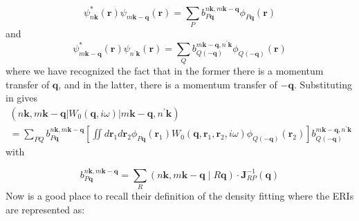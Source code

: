\begin{equation*}
\psi_{n \mathbf{k}}^{*}(\mathbf{r}) \psi_{m \mathbf{k}-\mathbf{q}}(\mathbf{r})=\sum_{P} b_{P \mathbf{q}}^{n \mathbf{k}, m \mathbf{k}-\mathbf{q}} \phi_{P \mathbf{q}}(\mathbf{r}) 
\end{equation*}
and
\begin{equation}
    \psi_{m\mathbf{k}-\mathbf{q}}^{*}(\mathbf{r}) \psi_{n^{\prime}\mathbf{k}}(\mathbf{r}) = \sum_{Q} b_{Q(-\mathbf{q})}^{m\mathbf{k}-\mathbf{q}, n^{\prime}\mathbf{k}} \phi_{Q(-\mathbf{q})}(\mathbf{r})
\end{equation}
where we have recognized the fact that in the former there is a momentum transfer of $\mathbf{q}$, and in the latter, there is a momentum transfer of $-\mathbf{q}$.
Substituting in gives
\begin{align}
    \left(n\mathbf{k}, m\mathbf{k}-\mathbf{q}\left|W_{0}(\mathbf{q}, i\omega )\right| m\mathbf{k}-\mathbf{q}, n^{\prime}\mathbf{k}\right)\\ = \sum_{PQ} b_{P\mathbf{q}}^{n\mathbf{k}, m\mathbf{k}-\mathbf{q}} \left[\iint d\mathbf{r}_1 d\mathbf{r}_2 \phi_{P\mathbf{q}}(\mathbf{r}_1) W_0(\mathbf{q}, \mathbf{r}_1, \mathbf{r}_2, i\omega ) \phi_{Q(-\mathbf{q})}(\mathbf{r}_2)\right] b_{Q(-\mathbf{q})}^{m\mathbf{k}-\mathbf{q}, n^{\prime}\mathbf{k}}
\end{align}
with

\begin{equation}
b_{P \mathbf{q}}^{n \mathbf{k}, m \mathbf{k}-\mathbf{q}}=\sum_{R}(n \mathbf{k}, m \mathbf{k}-\mathbf{q} \mid R \mathbf{q}) \cdot \mathbf{J}_{R P}^{-1}(\mathbf{q})
\label{eq:nonchol}
\end{equation}
Now is a good place to recall their definition of the density fitting where the ERIs are represented as:


